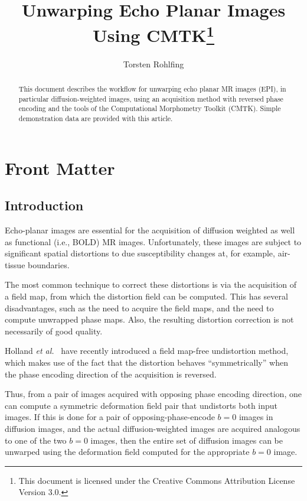 \documentclass{InsightArticle}
\title{Unwarping Echo Planar Images Using CMTK\footnote{This document is licensed under
    the Creative Commons Attribution License Version 3.0.}}
\author{Torsten Rohlfing}
\begin{document}
\maketitle

\ifhtml
\chapter*{Front Matter\label{front}}
\fi


\begin{abstract}
\noindent This document describes the workflow for unwarping echo planar MR
images (EPI), in particular diffusion-weighted images, using an acquisition method
with reversed phase encoding and the tools of the Computational Morphometry
Toolkit (CMTK). Simple demonstration data are provided with this article.
\end{abstract}

\tableofcontents

\clearpage
\section{Introduction}

Echo-planar images are essential for the acquisition of diffusion weighted as
well as functional (i.e., BOLD) MR images. Unfortunately, these images are
subject to significant spatial distortions to due susceptibility changes at,
for example, air-tissue boundaries.

The most common technique to correct these distortions is via the acquisition
of a field map, from which the distortion field can be computed. This has
several disadvantages, such as the need to acquire the field maps, and the
need to compute unwrapped phase maps. Also, the resulting distortion
correction is not necessarily of good quality.

Holland {\em et al.\/}~\cite{HollKupeDale:2010} have recently introduced a
field map-free undistortion method, which makes use of the fact that the
distortion behaves ``symmetrically'' when the phase encoding direction of the
acquisition is reversed.

Thus, from a pair of images acquired with opposing phase encoding direction,
one can compute a symmetric deformation field pair that undistorts both input
images. If this is done for a pair of opposing-phase-encode $b=0$ images in
diffusion images, and the actual diffusion-weighted images are acquired
analogous to one of the two $b=0$ images, then the entire set of diffusion
images can be unwarped using the deformation field computed for the
appropriate $b=0$ image.
\end{document}
